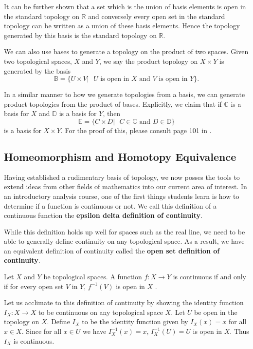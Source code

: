 \documentclass[12pt,oneside]{amsbook}
\newenvironment{defn}[1][Definition.]{\begin{trivlist}
\item[\hskip \labelsep {\bfseries #1}]}{\end{trivlist}}
\newcommand{\R}{\mathbb{R}}
\begin{document}
It can be further shown that a set which is the union of basis elements is open in the standard topology on $\R$ and conversely every open set in the standard topology can be written as a union of these basis elements. Hence the topology generated by this basis is the standard topology on $\R$.

We can also use bases to generate a topology on the product of two spaces. Given two  topological spaces, $X$ and $Y$, we say the product topology on $X\times Y$ is generated by the basis
$$\mathbb{B}=\{U\times V|\text{ } U \text{ is open in } X \text{ and } V \text{ is open in }Y\}.$$

In a similar manner to how we generate topologies from a basis, we can generate product topologies from the product of bases. Explicitly, we claim that if $\mathbb{C}$ is a basis for $X$ and $\mathbb{D}$ is a basis for $Y$, then $$\mathbb{E}=\{ C\times D |\text{ }C\in \mathbb{C} \text{ and } D\in \mathbb{D}\}$$ is a basis for $X\times Y$. For the proof of this, please consult page 101 in \cite{factory}.

\subsection{Homeomorphism and Homotopy Equivalence }
Having established a rudimentary basis of topology, we now posses the tools to extend ideas from other fields of mathematics into our current area of interest. In an introductory analysis course, one of the first things students learn is how to determine if a function is continuous or not. We call this definition of a continuous function the \textbf{epsilon delta definition of continuity}. 

While this definition holds up well for spaces such as the real line, we need to be able to generally define continuity on any topological space. As a result, we have an equivalent definition of continuity called the \textbf{open set definition of continuity}\cite{factory}.

\begin{defn}
Let $X$ and $Y$ be topological spaces. A function $f\colon X \rightarrow Y$ is continuous if and only if for every open set $V$ in $Y$, $f^{-1}(V)$ is open in $X$ . 
\end{defn}

Let us acclimate to this definition of continuity by showing the identity function $I_X\colon X\rightarrow X$ to be continuous on any topological space $X$. Let $U$ be open in the topology on $X$. Define $I_X$ to be the identity function given by $I_X(x)=x$ for all $x\in X$. Since for all $x\in U$ we have $I^{-1}_X(x)=x$, $I^{-1}_X(U)=U$ is open in $X$. Thus $I_X$ is continuous. 
\end{document}
